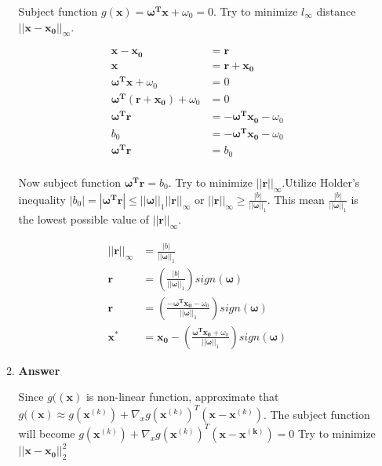 \documentclass[11pt]{article}
\begin{document}
\begin{enumerate}[label=(\alph*)]
\begin{enumerate}[label=(\roman*)]
Subject function $g(\mathbf{x}) = \boldsymbol{\omega^T}\mathbf{x} + \omega_0 = 0$. Try to minimize $l_\infty $ distance $||\mathbf{x}-\mathbf{x_0}||_\infty $.

\begin{align*}
\mathbf{x}-\mathbf{x_0} &= \mathbf{r} \\
\mathbf{x} &= \mathbf{r} + \mathbf{x_0}\\
\boldsymbol{\omega^T}\mathbf{x} + \omega_0 &= 0 \\
\boldsymbol{\omega^T}( \mathbf{r} + \mathbf{x_0}) + \omega_0 &= 0 \\
\boldsymbol{\omega^T} \mathbf{r} &= - \boldsymbol{\omega^T}\mathbf{x_0} - \omega_0  \\
b_0 &= - \boldsymbol{\omega^T}\mathbf{x_0} - \omega_0  \\
\boldsymbol{\omega^T} \mathbf{r} &= b_0  \\
\end{align*}

Now subject function $\boldsymbol{\omega^T} \mathbf{r} = b_0$. Try to minimize $||\mathbf{r}||_\infty $.Utilize Holder’s inequality $|b_0| = |\boldsymbol{\omega^T} \mathbf{r}| \leq ||\boldsymbol{\omega}||_1||\mathbf{r}||_\infty $ or $||\mathbf{r}||_\infty \geq \frac{ |b| }{||\boldsymbol{\omega}||_1}$. This mean $\frac{ |b| }{||\boldsymbol{\omega}||_1}$ is the lowest possible value of $||\mathbf{r}||_\infty$. 

\begin{align*}
||\mathbf{r}||_\infty &= \frac{ |b| }{||\boldsymbol{\omega}||_1} \\
\mathbf{r} &= (\frac{ |b| }{||\boldsymbol{\omega}||_1}) sign(\boldsymbol{\omega})\\
\mathbf{r} &= (\frac{ - \boldsymbol{\omega^T}\mathbf{x_0} - \omega_0  }{||\boldsymbol{\omega}||_1}) sign(\boldsymbol{\omega})\\
\mathbf{x^*} &= \mathbf{x_0} -  (\frac{ \boldsymbol{\omega^T}\mathbf{x_0} + \omega_0  }{||\boldsymbol{\omega}||_1}) sign(\boldsymbol{\omega})
\end{align*}

\item \noindent\textbf{Answer}

Since $g((\mathbf{x})$ is non-linear function, approximate that $g((\mathbf{x}) \approx g(\mathbf{x}^{(k)})+ \nabla_x g(\mathbf{x}^{(k)})^T(\mathbf{x} - \mathbf{x}^{(k)})$. The subject function will become $ g(\mathbf{x}^{(k)})+ \nabla_x g(\mathbf{x}^{(k)})^T(\mathbf{x} - \mathbf{x^{(k)}}) = 0$ Try to minimize $||\mathbf{x}-\mathbf{x_0}||_2^2$


\end{enumerate}
\end{enumerate}
\end{document}
